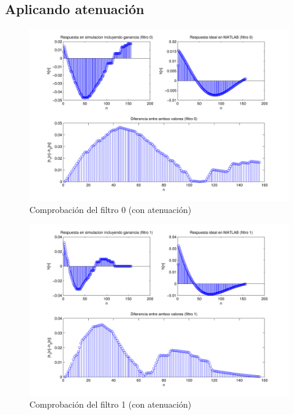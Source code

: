 \documentclass[a4paper,12pt]{article}
\begin{document}
\subsection{Aplicando atenuación}
\begin{figure}[hbt]
\includegraphics[width=\textwidth]{img/respfiltro0_gain.pdf} 
\caption{Comprobación del filtro 0 (con atenuación)} \label{fig:filter0_gain}
\end{figure}

\begin{figure}[hbt]
\includegraphics[width=\textwidth]{img/respfiltro1_gain.pdf} 
\caption{Comprobación del filtro 1 (con atenuación)} \label{fig:filter1_gain}
\end{figure}
\end{document}
